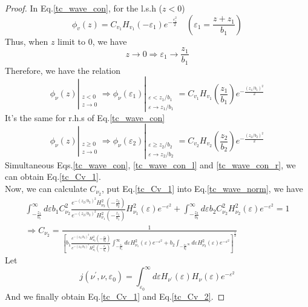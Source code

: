\begin{proof}
In Eq.\eqref{tc_wave_con}, for the l.s.h ($z < 0$)
\begin{equation}
  \phi_v(z) = C_{v_1} H_{v_1}(-\varepsilon_1) e^{-\frac{\varepsilon_1^2}{2}}  \quad (\varepsilon_1 = \frac{z+z_1}{b_1})
\end{equation}
Thus, when $z$ limit to $0$, we have
\begin{equation}
  z \to 0 \Rightarrow \varepsilon_1 \to \frac{z_1}{b_1}
\end{equation}
Therefore, we have the relation
\begin{equation}
  \phi_\nu(z) \left|_{\substack{z < 0 \\ z \to 0}} \right. \Rightarrow \phi_\nu(\varepsilon_1) \left|_{\substack{\varepsilon < z_1/b_1 \\ \varepsilon \to z_1/b_1}} \right. = C_{v_1} H_{v_1}(\frac{z_1}{b_1}) e^{-\frac{(z_1/b_1)^2}{2}} \label{tc_wave_con_l}
\end{equation}
It's the same for r.h.s of Eq.\eqref{tc_wave_con}
\begin{equation}
  \phi_\nu(z) \left|_{\substack{z \geqslant 0 \\ z \to 0}} \right. \Rightarrow \phi_\nu(\varepsilon_2) \left|_{\substack{\varepsilon \geqslant z_2/b_2 \\ \varepsilon \to z_2/b_2}} \right. = C_{v_2} H_{v_2}(\frac{z_2}{b_2}) e^{-\frac{(z_2/b_2)^2}{2}} \label{tc_wave_con_r}
\end{equation}
Simultaneous Eqs.\eqref{tc_wave_con}, \eqref{tc_wave_con_l} and \eqref{tc_wave_con_r}, we can obtain Eq.\eqref{tc_Cv_1}. \\
Now, we can calculate $C_{\nu_2}$, put Eq.\eqref{tc_Cv_1} into Eq.\eqref{tc_wave_norm}, we have
\begin{equation}
  \begin{aligned}
    \int_{-\frac{z_1}{b_1}}^{\infty} d\varepsilon b_1 C_{\nu_2}^2 \frac{e^{-(z_2/b_2)^2} H_{\nu_2}^2(-\frac{z_2}{b_2})}{e^{-(z_2/b_2)^2}H_{\nu_1}^2(-\frac{z_1}{b_1})} H_{\nu_1}^2(\varepsilon) e^{-\varepsilon^2}  + \int_{-\frac{z_2}{b_2}}^{\infty} d\varepsilon b_2 C_{\nu_2}^2 H_{\nu_2}^2(\varepsilon) e^{-\varepsilon^2} = 1  \\
    \Rightarrow C_{\nu_2} = \frac{1}{\left[ b_1 \frac{e^{-(z_2/b_2)^2} H_{\nu_2}^2(-\frac{z_2}{b_2})}{e^{-(z_2/b_2)^2}H_{\nu_1}^2(-\frac{z_1}{b_1})} \int_{-\frac{z_1}{b_1}}^{\infty} d\varepsilon H_{\nu_1}^2(\varepsilon) e^{-\varepsilon^2} + b_2 \int_{-\frac{z_2}{b_2}^{\infty}} d\varepsilon H_{\nu_2}^2(\varepsilon) e^{-\varepsilon^2} \right]^{\frac{1}{2}}}
  \end{aligned}
\end{equation}
Let
\begin{equation*}
  j(\nu^\prime, \nu, \varepsilon_0) = \int_{\varepsilon_0}^{\infty} d\varepsilon H_{\nu^\prime}(\varepsilon) H_{\nu}(\varepsilon) e^{-\varepsilon^2}
\end{equation*}
And we finally obtain Eq.\eqref{tc_Cv_1} and Eq.\eqref{tc_Cv_2}.
\end{proof}


